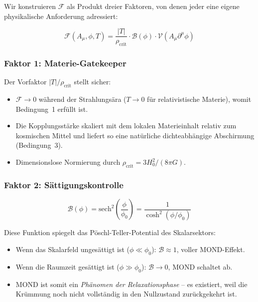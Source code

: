 \documentclass[aps,prd,twocolumn,superscriptaddress,nofootinbib]{revtex4-2}
\begin{document}
Wir konstruieren $\mathcal{F}$ als Produkt dreier Faktoren, von denen jeder eine eigene physikalische Anforderung adressiert:

\begin{equation}
\mathcal{F}(A_\mu, \phi, T) = \frac{|T|}{\rho_{\mathrm{crit}}} \cdot \mathcal{B}(\phi) \cdot \mathcal{V}(A_\mu \partial^\mu \phi)
\label{eq:coupling}
\end{equation}

\subsubsection{Faktor 1: Materie-Gatekeeper}

Der Vorfaktor $|T|/\rho_{\mathrm{crit}}$ stellt sicher:
\begin{itemize}
\item $\mathcal{F} \to 0$ w\"ahrend der Strahlungs\"ara ($T \to 0$ f\"ur relativistische Materie), womit Bedingung~1 erf\"ullt ist.
\item Die Kopplungsst\"arke skaliert mit dem lokalen Materieinhalt relativ zum kosmischen Mittel und liefert so eine nat\"urliche dichteabh\"angige Abschirmung (Bedingung~3).
\item Dimensionslose Normierung durch $\rho_{\mathrm{crit}} = 3H_0^2/(8\pi G)$.
\end{itemize}

\subsubsection{Faktor 2: S\"attigungskontrolle}

\begin{equation}
\mathcal{B}(\phi) = \mathrm{sech}^2\!\left(\frac{\phi}{\phi_0}\right) = \frac{1}{\cosh^2(\phi/\phi_0)}
\label{eq:B_phi}
\end{equation}

Diese Funktion spiegelt das P\"oschl-Teller-Potential des Skalarsektors:
\begin{itemize}
\item Wenn das Skalarfeld unges\"attigt ist ($\phi \ll \phi_0$): $\mathcal{B} \approx 1$, voller MOND-Effekt.
\item Wenn die Raumzeit ges\"attigt ist ($\phi \gg \phi_0$): $\mathcal{B} \to 0$, MOND schaltet ab.
\item MOND ist somit ein \textit{Ph\"anomen der Relaxationsphase} -- es existiert, weil die Kr\"ummung noch nicht vollst\"andig in den Nullzustand zur\"uckgekehrt ist.
\end{itemize}
\end{document}

